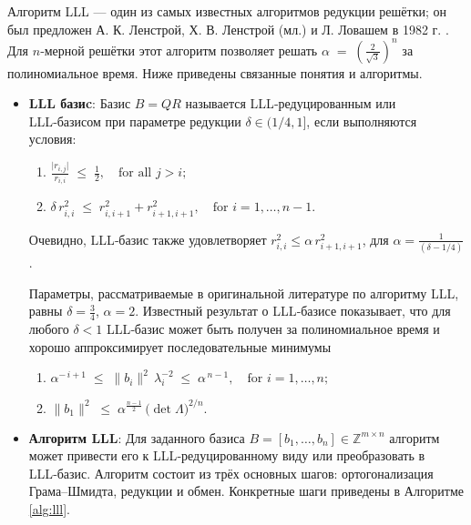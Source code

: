 Алгоритм LLL — один из самых известных алгоритмов редукции решётки; он был
предложен А. К. Ленстрой, Х. В. Ленстрой (мл.) и Л. Ловашем в 1982 г.
\cite{cite_35}. Для $n$‑мерной решётки этот алгоритм позволяет решать $\alpha
\;=\; \left(\frac{2}{\sqrt{3}}\right)^{n}$ за полиномиальное время. Ниже
приведены связанные понятия и алгоритмы.


\begin{itemize}
    \item \textbf{LLL базиc}: Базис $B = QR$ называется LLL‑редуцированным или
        LLL‑базисом при параметре редукции $\delta\in(1/4,1]$, если выполняются
        условия:
        \begin{enumerate}
            \item $\frac{\lvert r_{i,j}\rvert}{r_{i,i}} \;\le\; \frac12, \quad \text{for all } j > i;$
            \item $\delta\, r_{i,i}^{2}\;\le\;r_{i,i+1}^{2} + r_{i+1,i+1}^{2},\quad \text{for } i = 1,\ldots,n-1.$
            \setcounter{tmp-enum-lll}{\value{enumi}}
        \end{enumerate}

        Очевидно, LLL‑базис также удовлетворяет
        \( r_{i,i}^{2} \le \alpha\, r_{i+1,i+1}^{2} \),
        для \(\alpha = \frac{1}{(\delta - 1 / 4)}\).

        Параметры, рассматриваемые в оригинальной литературе по алгоритму LLL,
        равны $\delta = \tfrac34$, $\alpha = 2$. Известный результат о LLL‑базисе
        показывает, что для любого $\delta < 1$ LLL‑базис может быть получен за
        полиномиальное время и хорошо аппроксимирует последовательные минимумы\:

        \begin{enumerate}
            \setcounter{enumi}{\value{tmp-enum-lll}}
            \item $\alpha^{-\,i+1} \;\le\; \lVert b_{i}\rVert^{2}\,\lambda_{i}^{-2}
                \;\le\; \alpha^{\,n-1}, \quad \text{for } i = 1,\ldots,n;$
            \item $\lVert b_{1}\rVert^{2} \;\le\; \alpha^{\frac{n-1}{2}}\,
                \bigl(\det\Lambda\bigr)^{2/n}.$
        \end{enumerate}

    \item \textbf{Алгоритм LLL}: Для заданного базиса
        $B = [b_{1},\ldots,b_{n}] \in \mathbb{Z}^{m\times n}$
        алгоритм может привести его к LLL‑редуцированному виду
        или преобразовать в LLL‑базис. Алгоритм состоит из трёх
        основных шагов: ортогонализация Грама–Шмидта, редукции и
        обмен. Конкретные шаги приведены в Алгоритме \ref{alg:lll}.
\end{itemize}


